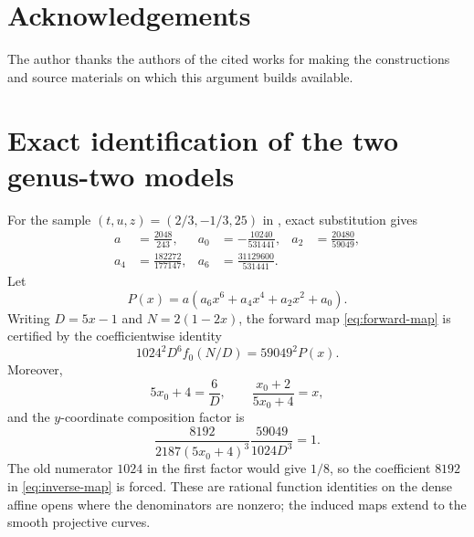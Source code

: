 \documentclass[11pt,reqno]{amsart}
\theoremstyle{definition}
\theoremstyle{remark}
\begin{document}
\section*{Acknowledgements}

The author thanks the authors of the cited works for making the constructions
and source materials on which this argument builds available.

\appendix

\section{Exact identification of the two genus-two models}\label{app:model}

For the sample \((t,u,z)=(2/3,-1/3,25)\) in
\cite[Section~2]{BartzLevinThamminana2025}, exact substitution gives
\[
\begin{aligned}
  a&=\frac{2048}{243},
  &a_0&=-\frac{10240}{531441},
  &a_2&=\frac{20480}{59049},\\
  a_4&=\frac{182272}{177147},
  &a_6&=\frac{31129600}{531441}.
\end{aligned}
\]
Let
\[
  P(x)=a(a_6x^6+a_4x^4+a_2x^2+a_0).
\]
Writing \(D=5x-1\) and \(N=2(1-2x)\), the forward map
\eqref{eq:forward-map} is certified by the coefficientwise identity
\begin{equation}\label{eq:forward-identity}
  1024^2D^6 f_0(N/D)=59049^2P(x).
\end{equation}
Moreover,
\[
  5x_0+4=\frac6D,
  \qquad
  \frac{x_0+2}{5x_0+4}=x,
\]
and the \(y\)-coordinate composition factor is
\[
  \frac{8192}{2187(5x_0+4)^3}
  \frac{59049}{1024D^3}=1.
\]
The old numerator \(1024\) in the first factor would give \(1/8\), so the
coefficient \(8192\) in \eqref{eq:inverse-map} is forced.  These are rational
function identities on the dense affine opens where the denominators are
nonzero; the induced maps extend to the smooth projective curves.



\end{document}
